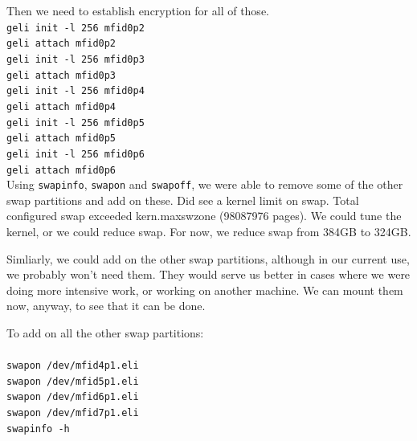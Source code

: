 Then we need to establish   \gls{encrypt}ion for all of those.\\

\noindent\texttt{geli init -l 256 mfid0p2}\\
\texttt{geli attach mfid0p2}\\
\texttt{geli init -l 256 mfid0p3}\\
\texttt{geli attach mfid0p3}\\
\texttt{geli init -l 256 mfid0p4}\\
\texttt{geli attach mfid0p4}\\
\texttt{geli init -l 256 mfid0p5}\\
\texttt{geli attach mfid0p5}\\
\texttt{geli init -l 256 mfid0p6}\\
\texttt{geli attach mfid0p6}\\

Using \texttt{swapinfo}, \texttt{swapon} and \texttt{swapoff}, we were able to remove some of the other swap partitions and add on these.  Did see a \gls{kernel} limit on swap.  Total configured swap exceeded kern.maxswzone (98087976 pages).  We could tune the \gls{kernel}, or we could reduce swap.  For now, we reduce swap from 384GB to 324GB.

Simliarly, we could add on the other swap partitions, although in our current use, we probably won’t need them.  They would serve us better in cases where we were doing more intensive work, or working on another machine.  We can mount them now, anyway, to see that it can be done.

To add on all the other swap partitions:\\\\
\noindent\texttt{swapon /dev/mfid4p1.eli}\\
\texttt{swapon /dev/mfid5p1.eli}\\
\texttt{swapon /dev/mfid6p1.eli}\\
\texttt{swapon /dev/mfid7p1.eli}\\
\texttt{swapinfo -h}\\

